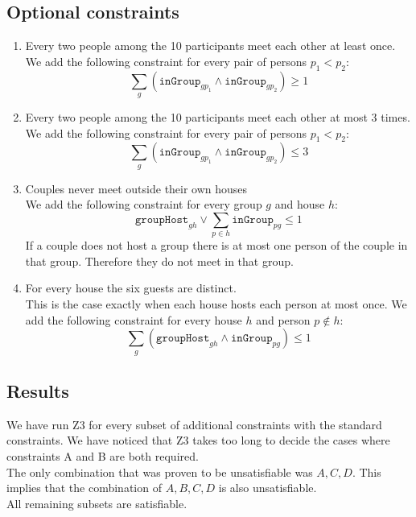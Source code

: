 \documentclass{scrartcl}
\begin{document}
\begin{itemize}
\subsection{Optional constraints} %
\label{sub:dinner_optional_constraints}
\begin{enumerate}[label=\Alph*)]
	\item Every two people among the 10 participants meet each other at least once.\\
	We add the following constraint for every pair of persons $p_1<p_2$:
	$$\sum_g(\mathtt{inGroup}_{gp_1}\land\mathtt{inGroup}_{gp_2})\geq 1$$
	\item Every two people among the 10 participants meet each other at most $3$ times.\\
	We add the following constraint for every pair of persons $p_1<p_2$:
	$$\sum_g(\mathtt{inGroup}_{gp_1}\land\mathtt{inGroup}_{gp_2})\leq 3$$
	\item Couples never meet outside their own houses\\
	We add the following constraint for every group $g$ and house $h$:
	$$\mathtt{groupHost}_{gh}\lor\sum_{p\in h}\mathtt{inGroup}_{pg}\leq 1$$
	If a couple does not host a group there is at most one person of the couple in that group. Therefore they do not meet in that group.
	\item For every house the six guests are distinct.\\
	This is the case exactly when each house hosts each person at most once.
	We add the following constraint for every house $h$ and person $p\notin h$:
	$$\sum_{g}(\mathtt{groupHost}_{gh}\land \mathtt{inGroup}_{pg})\leq 1$$
\end{enumerate}

\subsection{Results} %
\label{sub:dinner_results}
We have run Z3 for every subset of additional constraints with the standard constraints.
We have noticed that Z3 takes too long to decide the cases where constraints A and B are both required.\\
The only combination that was proven to be unsatisfiable was $A,C,D$. This implies that the combination of $A,B,C,D$ is also unsatisfiable.\\
All remaining subsets are satisfiable.\\


\end{itemize}
\end{document}
